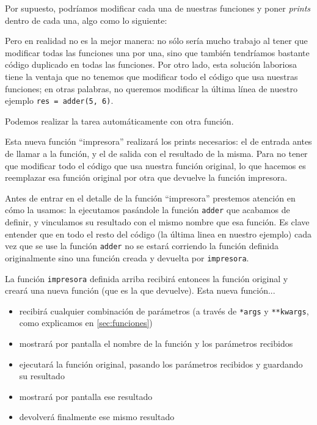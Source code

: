 
Por supuesto, podríamos modificar cada una de nuestras funciones y poner \textit{prints} dentro de cada una, algo como lo siguiente:


Pero en realidad no es la mejor manera: no sólo sería mucho trabajo al tener que modificar todas las funciones una por una, sino que también tendríamos bastante código duplicado en todas las funciones. Por otro lado, esta solución laboriosa tiene la ventaja que no tenemos que modificar todo el código que usa nuestras funciones; en otras palabras, no queremos modificar la última línea de nuestro ejemplo \texttt{res = adder(5, 6)}.

Podemos realizar la tarea automáticamente con otra función. 

Esta nueva función ``impresora'' realizará los prints necesarios: el de entrada antes de llamar a la función, y el de salida con el resultado de la misma. Para no tener que modificar todo el código que usa nuestra función original, lo que hacemos es reemplazar esa función original por otra que devuelve la función impresora.


Antes de entrar en el detalle de la función ``impresora'' prestemos atención en cómo la usamos: la ejecutamos pasándole la función \texttt{adder} que acabamos de definir, y vinculamos su resultado con el mismo nombre que esa función. Es clave entender que en todo el resto del código (la última linea en nuestro ejemplo) cada vez que se use la función \texttt{adder} no se estará corriendo la función definida originalmente sino una función creada y devuelta por \texttt{impresora}.

La función \texttt{impresora} definida arriba recibirá entonces la función original y creará una nueva función (que es la que devuelve). Esta nueva función...

\begin{itemize}
\item recibirá cualquier combinación de parámetros (a través de \texttt{*args} y \texttt{**kwargs}, como explicamos en \ref{sec:funciones})
\item mostrará por pantalla el nombre de la función y los parámetros recibidos
\item ejecutará la función original, pasando los parámetros recibidos y guardando su resultado
\item mostrará por pantalla ese resultado
\item devolverá finalmente ese mismo resultado
\end{itemize}

